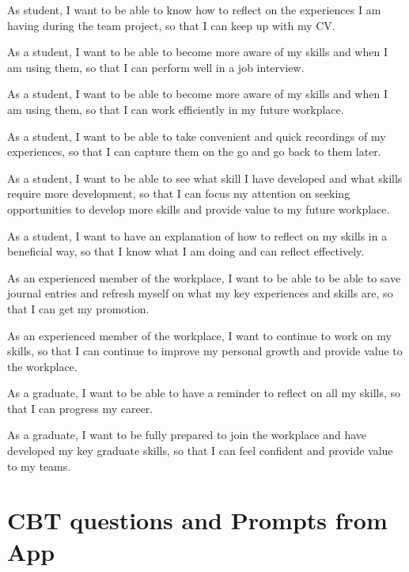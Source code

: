 \documentclass{l4proj}
\begin{document}
\begin{appendices}
As student, I want to be able to know how to reflect on the experiences I am having during the team project, so that I can keep up with my CV.

As a student, I want to be able to become more aware of my skills and when I am using them, so that I can perform well in a job interview.

As a student, I want to be able to become more aware of my skills and when I am using them, so that I can work efficiently in my future workplace.

As a student, I want to be able to take convenient and quick recordings of my experiences, so that I can capture them on the go and go back to them later.

As a student, I want to be able to see what skill I have developed and what skills require more development, so that I can focus my attention on seeking opportunities to develop more skills and provide value to my future workplace.

As a student, I want to have an explanation of how to reflect on my skills in a beneficial way, so that I know what I am doing and can reflect effectively.

As an experienced member of the workplace, I want to be able to be able to save journal entries and refresh myself on what my key experiences and skills are, so that I can get my promotion.

As an experienced member of the workplace, I want to continue to work on my skills, so that I can continue to improve my personal growth and provide value to the workplace.

As a graduate, I want to be able to have a reminder to reflect on all my skills, so that I can progress my career.

As a graduate, I want to be fully prepared to join the workplace and have developed my key graduate skills, so that I can feel confident and provide value to my teams.

%

\section{CBT questions and Prompts from App} \label{Appendix-AppCBTQuestions-Prompts}


\end{appendices}
\end{document}
